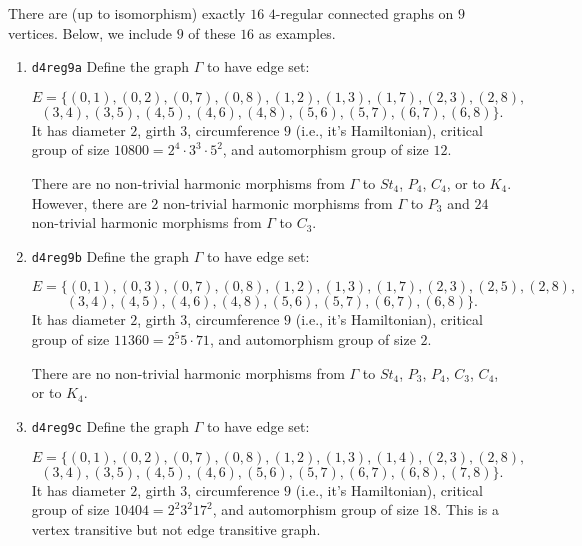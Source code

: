 \documentclass[12pt,letterpaper]{article}
\theoremstyle{definition}
\begin{document}
There are (up to isomorphism) exactly $16$ $4$-regular connected graphs on $9$ vertices.
Below, we include $9$ of these $16$ as examples.

\begin{enumerate}
\item
  {\tt d4reg9a}\newline
Define the graph  $\Gamma$ to have edge set:

\[
E = \{
(0, 1), (0, 2), (0, 7), (0, 8), (1, 2), (1, 3), (1, 7), (2, 3), (2, 8),
\]
\[
 (3, 4), (3, 5), (4, 5), (4, 6), (4, 8), (5, 6), (5, 7), (6, 7), (6, 8)
\}.
\]
It has diameter $2$,
girth $3$, circumference $9$ (i.e., it's Hamiltonian),
critical group of size $10800 = 2^4\cdot 3^3\cdot 5^2$, 
and automorphism group of size $12$.

There are no non-trivial harmonic morphisms from $\Gamma$ to $St_4$,
$P_4$, $C_4$, or to $K_4$.  However, there are $2$ non-trivial
harmonic morphisms from $\Gamma$ to $P_3$ and $24$ non-trivial
harmonic morphisms from $\Gamma$ to $C_3$.

\item
  {\tt d4reg9b}\newline  
Define the graph $\Gamma$ to have edge set:

\[
E = \{
(0, 1), (0, 3), (0, 7), (0, 8), (1, 2), (1, 3), (1, 7), (2, 3), (2, 5), (2, 8),
\]
\[
(3, 4), (4, 5), (4, 6), (4, 8), (5, 6), (5, 7), (6, 7), (6, 8)
\}.
\]
It has diameter $2$,
girth $3$, circumference $9$ (i.e., it's Hamiltonian),
critical group of size $11360 = 2^5 5\cdot 71$, 
and automorphism group of size $2$.

There are no non-trivial harmonic morphisms from $\Gamma$ to
$St_4$, $P_3$, $P_4$, $C_3$, $C_4$, or to $K_4$.  

\item
{\tt d4reg9c}\newline  
Define the graph $\Gamma$ to have edge set:

\[
E = \{
(0, 1), (0, 2), (0, 7), (0, 8), (1, 2), (1, 3), (1, 4), (2, 3), (2, 8), 
\]
\[
(3, 4), (3, 5), (4, 5), (4, 6), (5, 6), (5, 7), (6, 7), (6, 8), (7, 8)
\}.
\]
It has diameter $2$,
girth $3$, circumference $9$ (i.e., it's Hamiltonian),
critical group of size $10404 = 2^2 3^2 17^2$, 
and automorphism group of size $18$.
This is a vertex transitive but not edge transitive graph.


\end{enumerate}
\end{document}
